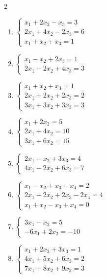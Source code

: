 \begin{multicols}{2}\raggedright
\small
\begin{enumerate}[label=\arabic*., leftmargin=*]

\item $\begin{cases}x_1+2x_2-x_3=3\\2x_1+4x_2-2x_3=6\\x_1+x_2+x_3=1\end{cases}$

\item $\begin{cases}x_1-x_2+2x_3=1\\2x_1-2x_2+4x_3=3\end{cases}$

\item $\begin{cases}x_1+x_2+x_3=1\\2x_1+2x_2+2x_3=2\\3x_1+3x_2+3x_3=3\end{cases}$

\item $\begin{cases}x_1+2x_2=5\\2x_1+4x_2=10\\3x_1+6x_2=15\end{cases}$

\item $\begin{cases}2x_1-x_2+3x_3=4\\4x_1-2x_2+6x_3=7\end{cases}$

\item $\begin{cases}x_1-x_2+x_3-x_4=2\\2x_1-2x_2+2x_3-2x_4=4\\x_1+x_2-x_3+x_4=0\end{cases}$

\item $\begin{cases}3x_1-x_2=5\\-6x_1+2x_2=-10\end{cases}$

\item $\begin{cases}x_1+2x_2+3x_3=1\\4x_1+5x_2+6x_3=2\\7x_1+8x_2+9x_3=3\end{cases}$


\end{enumerate}
\end{multicols}
